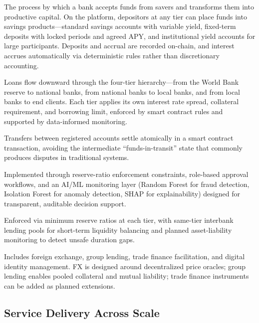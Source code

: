 \documentclass[12pt,a4paper]{report}
\begin{document}
\begin{description}[leftmargin=0pt]
\item[\textbf{Deposit Mobilization.}] The process by which a bank accepts funds from savers and transforms them into productive capital. On the platform, depositors at any tier can place funds into savings products---standard savings accounts with variable yield, fixed-term deposits with locked periods and agreed APY, and institutional yield accounts for large participants. Deposits and accrual are recorded on-chain, and interest accrues automatically via deterministic rules rather than discretionary accounting.
\item[\textbf{Credit Allocation.}] Loans flow downward through the four-tier hierarchy---from the World Bank reserve to national banks, from national banks to local banks, and from local banks to end clients. Each tier applies its own interest rate spread, collateral requirement, and borrowing limit, enforced by smart contract rules and supported by data-informed monitoring.
\item[\textbf{Payment and Settlement.}] Transfers between registered accounts settle atomically in a smart contract transaction, avoiding the intermediate ``funds-in-transit'' state that commonly produces disputes in traditional systems.
\item[\textbf{Risk Intermediation.}] Implemented through reserve-ratio enforcement constraints, role-based approval workflows, and an AI/ML monitoring layer (Random Forest for fraud detection, Isolation Forest for anomaly detection, SHAP for explainability) designed for transparent, auditable decision support.
\item[\textbf{Liquidity Management.}] Enforced via minimum reserve ratios at each tier, with same-tier interbank lending pools for short-term liquidity balancing and planned asset-liability monitoring to detect unsafe duration gaps.
\item[\textbf{Ancillary Financial Services.}] Includes foreign exchange, group lending, trade finance facilitation, and digital identity management. FX is designed around decentralized price oracles; group lending enables pooled collateral and mutual liability; trade finance instruments can be added as planned extensions.
\end{description}

\subsection{Service Delivery Across Scale}
\end{document}
